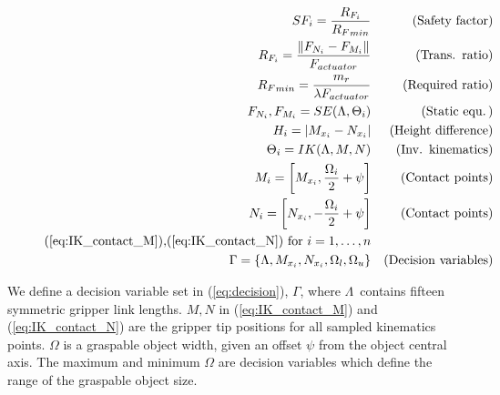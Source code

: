 \documentclass[letterpaper, 10 pt, conference]{ieeeconf}  %
\newcommand{\eq}[1]{(\ref{#1})}
\newcommand{\norm}[1]{\| #1 \|}
\newcommand{\abs}[1]{\lvert #1 \rvert}
\begin{document}
\begin{figure}
\begin{subequations}
\begin{align}
SF_i=\frac{{R_{F_i}}}{ {R_F}_{min}}&& \color{black}\operatorname{(Safety\ factor)}\label{eq:sf}\\
{R_{F_i}} = \frac{\norm{F_{N_i}-F_{M_i}}}{F_{actuator}} && \color{black}\operatorname{(Trans.\ ratio)}\label{eq:ratio_gripper}
\\%
{R_F}_{min} = \frac{m_r}{\lambda F_{actuator}} && \color{black}\operatorname{(Required\ ratio)}\label{eq:ratio_min}\\
F_{N_i},F_{M_i}=SE(\Lambda,\Theta_i)&& \color{black}\operatorname{(Static\ equ.)}\label{eq:static_equ}\\
H_i = \abs{M_{x_i}-N_{x_i}} \label{eq:H_i} && \color{black}\operatorname{(Height\ difference)}\\
\Theta_i = IK(\Lambda,M,N)\label{eq:IK} && \color{black}\operatorname{(Inv.\ kinematics)}\\
M_i=\left[M_{x_i}, \frac{ { \Omega_i }}{2}+\operatorname{ \psi}\right] \label{eq:IK_contact_M} && \color{black}\operatorname{(Contact\ points)}\\
N_i=\left[N_{x_i}, -\frac{ { \Omega_i }}{2}+ \operatorname{ \psi }\right] \label{eq:IK_contact_N} && \color{black}\operatorname{(Contact\ points)}\\
\text{\eq{eq:IK_contact_M},\eq{eq:IK_contact_N} for }i=1,\dots,n \nonumber\\
\Gamma = \{\Lambda,M_{x_i},N_{x_i},\Omega_{l},\Omega_{u}\} && \color{black}\operatorname{(Decision\ variables)} \label{eq:decision}
\end{align}
\end{subequations}
\end{figure}




We define a decision variable set in \eq{eq:decision}, $\Gamma$, where $\Lambda$\ contains fifteen symmetric gripper link lengths. $M, N$ in \eq{eq:IK_contact_M}  and \eq{eq:IK_contact_N} are the gripper tip positions for all sampled kinematics points. $\Omega$ is a graspable object width, given an offset $\psi$ from the object central axis. The maximum and minimum $\Omega$ are decision variables which define the range of the graspable object size.
\end{document}
